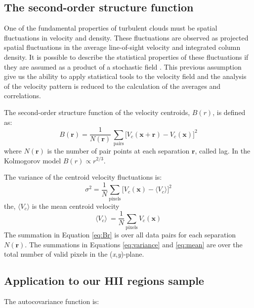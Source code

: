 \documentclass[fleqn,usenatbib, useAMS, a4paper]{mnras}
\begin{document}
\subsection{The second-order structure function}
\label{sec:second-order-struct}
One of the fundamental properties of turbulent clouds must be spatial fluctuations in velocity and density.
These fluctuations are observed as projected spatial fluctuations in the average line-of-sight velocity and integrated column density.
It is possible to describe the statistical properties of these fluctuations if they are assumed as a product of a stochastic field \citep{1984ApJ...277..556S}. 
This previous assumption give us the ability to apply statistical tools to the velocity field and the analysis of the velocity pattern is reduced to the calculation of the averages and correlations.

The second-order structure function of the velocity centroids, $B(r)$, is defined as:
%
\begin{equation}\label{eq:Br}
  B(\boldsymbol{r}) = \dfrac{1}{N(\boldsymbol{r})}
  \,
  \sum_{\text{pairs}} \bigl[
  V_{c}(\boldsymbol{x} + \boldsymbol{r}) - V_{c}(\boldsymbol{x})
  \bigr]^{2}
\end{equation}
%
where $N(\boldsymbol{r})$ is the number of pair points at each separation \(\boldsymbol{r}\), called lag. 
In the Kolmogorov model \(B(r) \propto r^{2/3}\).

The variance of the centroid velocity fluctuations is:
%
\begin{equation}\label{eq:variance}
\sigma^2  = \frac{1}{N} \sum_{\text{pixels}} \bigl[ V_c (\boldsymbol{x}) -\langle V_ c\rangle  \bigr]^2
\end{equation}
%
the, \(\langle V_c \rangle \) is the mean centroid velocity
%
\begin{equation}\label{eq:mean}
\langle V_c \rangle \  = \frac{1}{N} \sum_{\text{pixels}} V_c (\boldsymbol{x})
\end{equation}
%
The summation in Equation \ref{eq:Br} is over all data pairs for each separation \(N(\boldsymbol{r})\).
The summations in Equations \ref{eq:variance} and \ref{eq:mean} are over the total number of valid pixels in the (\textit{x},\textit{y})-plane.

\subsection{Application to our HII regions sample}\label{sec:apply}

The autocovariance function is:
\end{document}
